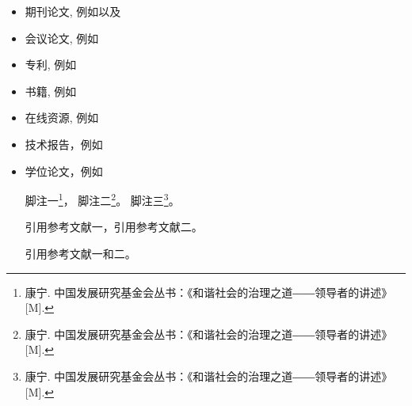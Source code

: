\begin{itemize}
\item[\ding{172}] 期刊论文, 例如\cite{XmDeng2007,Brown1984,ZHY2017RS,ZHY2012manifold}以及\cite{Wing2006CT,ZhangHY2025KuiperHOE}
\item[\ding{173}] 会议论文, 例如\cite{Geyer1999,Branislav2004}
\item[\ding{174}] 专利, 例如\cite{LongMA2015P}
\item[\ding{175}] 书籍, 例如\cite{CDIO2014,ZHY2022}
\item[\ding{176}] 在线资源, 例如\cite{SFMedu,OpenMVS,HainnuThesis}
\item[\ding{177}] 技术报告，例如\cite{Sussman2005}
\item[\ding{178}] 学位论文，例如\cite{ZHY2002,Xue2006,lzj-zhy-MS-thesis-2018,zls-zhy-MS-thesis-2016,zhy-2011-disertation}


脚注一\footnote{康宁. 中国发展研究基金会丛书：《和谐社会的治理之道――领导者的讲述》[M].}，
脚注二\footnote{康宁. 中国发展研究基金会丛书：《和谐社会的治理之道――领导者的讲述》[M].}。
脚注三\footnote{康宁. 中国发展研究基金会丛书：《和谐社会的治理之道――领导者的讲述》[M].}。

引用参考文献一\cite{gao1987}，引用参考文献二\cite{zhang1989}。

引用参考文献一和二\cite{gao1987,zhang1989}。


\end{itemize}
